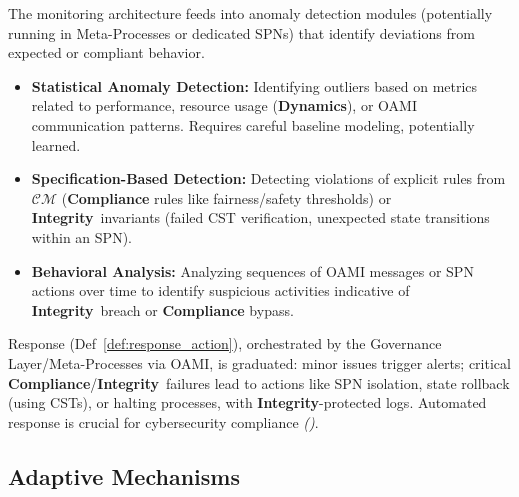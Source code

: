 \documentclass[12pt,a4paper]{report}
\renewcommand{\citep}[1]{\textit{\scriptsize{(\cite{#1})}}}
\newcommand{\Integrity}{\textbf{Integrity}}
\newcommand{\Dynamics}{\textbf{Dynamics}}
\begin{document}
	The monitoring architecture feeds into anomaly detection modules (potentially running in Meta-Processes or dedicated SPNs) that identify deviations from expected or compliant behavior.
	\begin{itemize}[noitemsep]
		\item \textbf{Statistical Anomaly Detection:} Identifying outliers based on metrics related to performance, resource usage (\Dynamics), or OAMI communication patterns. Requires careful baseline modeling, potentially learned.
		\item \textbf{Specification-Based Detection:} Detecting violations of explicit rules from $\mathcal{CM}$ (\textbf{Compliance} rules like fairness/safety thresholds) or \Integrity\ invariants (failed CST verification, unexpected state transitions within an SPN).
		\item \textbf{Behavioral Analysis:} Analyzing sequences of OAMI messages or SPN actions over time to identify suspicious activities indicative of \Integrity\ breach or \textbf{Compliance} bypass.
	\end{itemize}
	Response (Def~\ref{def:response_action}), orchestrated by the Governance Layer/Meta-Processes via OAMI, is graduated: minor issues trigger alerts; critical \textbf{Compliance}/\Integrity\ failures lead to actions like SPN isolation, state rollback (using CSTs), or halting processes, with \Integrity-protected logs. Automated response is crucial for cybersecurity compliance \citep{Automated_Cybersec_Compliance_2024}.
	
	\subsection{Adaptive Mechanisms} %
	\label{sec:4-5-3} %
	
\end{document}
